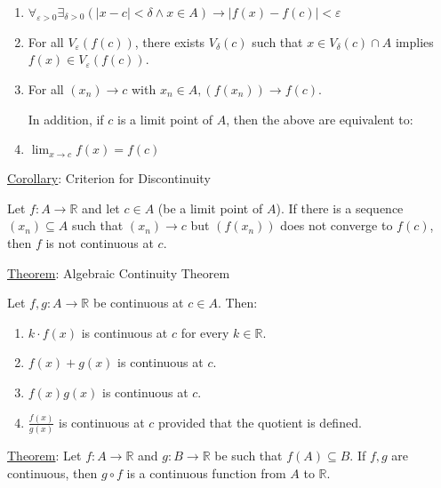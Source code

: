 \documentclass[12pt]{article}
\newcommand{\RR}{\mathbb{R}} %
\newcommand\abs[1]{\left| #1 \right|} %
\newcommand{\eps}{\varepsilon}
\begin{document}
\begin{enumerate}
\item $\forall_{\eps > 0} \exists_{\delta > 0} (\abs{x - c} < \delta \land x \in A) \rightarrow \abs{f(x) - f(c)} < \eps$

\item For all $V_\eps(f(c))$, there exists $V_\delta(c)$ such that $x \in V_\delta(c) \cap A$ implies $f(x) \in V_{\eps}(f(c))$.

\item For all $(x_n) \rightarrow c$ with $x_n \in A, (f(x_n)) \rightarrow f(c)$.

In addition, if $c$ is a limit point of $A$, then the above are equivalent to:

\item $\lim_{x \rightarrow c} f(x) = f(c)$
\end{enumerate}

\hrulefill

\underline{Corollary}: Criterion for Discontinuity

Let $f : A \rightarrow \RR$ and let $c \in A$ (be a limit point of $A$). If there is a sequence $(x_n) \subseteq A$ such that $(x_n) \rightarrow c$ but $(f(x_n))$ does not converge to $f(c)$, then $f$ is not continuous at $c$.

\hrulefill

\underline{Theorem}: Algebraic Continuity Theorem

Let $f, g : A \rightarrow \RR$ be continuous at $c \in A$. Then:

\begin{enumerate}
\item $k \cdot f(x)$ is continuous at $c$ for every $k \in \RR$.

\item $f(x) + g(x)$ is continuous at $c$.

\item $f(x)g(x)$ is continuous at $c$.

\item $\frac{f(x)}{g(x)}$ is continuous at $c$ provided that the quotient is defined.
\end{enumerate}

\hrulefill

\underline{Theorem}: Let $f : A \rightarrow \RR$ and $g : B \rightarrow \RR$ be such that $f(A) \subseteq B$. If $f, g$ are continuous, then $g \circ f$ is a continuous function from $A$ to $\RR$.

\pagebreak
\end{document}

